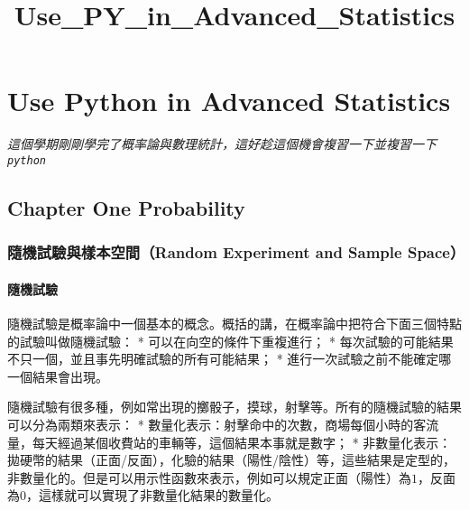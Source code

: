 \documentclass[11pt]{article}
\title{Use\_PY\_in\_Advanced\_Statistics }
\begin{document}
    
    
    \maketitle
    
    

    
    \hypertarget{use-python-in-advanced-statistics}{%
\section{Use Python in Advanced
Statistics}\label{use-python-in-advanced-statistics}}

\emph{這個學期剛剛學完了概率論與數理統計，這好趁這個機會複習一下並複習一下
\texttt{python}} 

    \hypertarget{chapter-one-probability}{%
\subsection{Chapter One Probability}\label{chapter-one-probability}}

\hypertarget{ux96a8ux6a5fux8a66ux9a57ux8207ux6a23ux672cux7a7aux9593random-experiment-and-sample-space}{%
\subsubsection{隨機試驗與樣本空間（Random Experiment and Sample
Space）}\label{ux96a8ux6a5fux8a66ux9a57ux8207ux6a23ux672cux7a7aux9593random-experiment-and-sample-space}}

\hypertarget{ux96a8ux6a5fux8a66ux9a57}{%
\paragraph{隨機試驗}\label{ux96a8ux6a5fux8a66ux9a57}}

隨機試驗是概率論中一個基本的概念。概括的講，在概率論中把符合下面三個特點的試驗叫做隨機試驗：
* 可以在向空的條件下重複進行； *
每次試驗的可能結果不只一個，並且事先明確試驗的所有可能結果； *
進行一次試驗之前不能確定哪一個結果會出現。

隨機試驗有很多種，例如常出現的擲骰子，摸球，射擊等。所有的隨機試驗的結果可以分為兩類來表示：
*
數量化表示：射擊命中的次數，商場每個小時的客流量，每天經過某個收費站的車輛等，這個結果本事就是數字；
*
非數量化表示：拋硬幣的結果（正面/反面），化驗的結果（陽性/陰性）等，這些結果是定型的，非數量化的。但是可以用示性函數來表示，例如可以規定正面（陽性）為\(1\)，反面為\(0\)，這樣就可以實現了非數量化結果的數量化。
\end{document}
